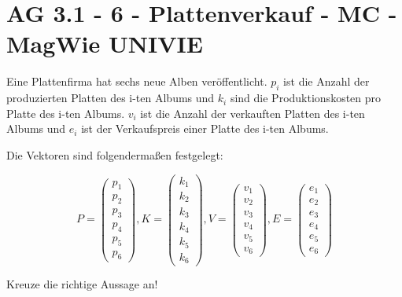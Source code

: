 \section{AG 3.1 - 6 - Plattenverkauf - MC - MagWie UNIVIE}

\begin{beispiel}[AG 3.1]{1}
Eine Plattenfirma hat sechs neue Alben veröffentlicht. $p_i$ ist die Anzahl der produzierten Platten des i-ten Albums und $k_i$ sind die Produktionskosten pro Platte des i-ten Albums. $v_i$ ist die Anzahl der verkauften Platten des i-ten Albums und $e_i$ ist der Verkaufspreis einer Platte des i-ten Albums.

Die Vektoren sind folgendermaßen festgelegt:

\[P=\left(\begin{array}{c}p_1\\p_2\\p_3\\p_4\\p_5\\p_6\end{array}\right), K=\left(\begin{array}{c}k_1\\k_2\\k_3\\k_4\\k_5\\k_6\end{array}\right), V=\left(\begin{array}{c}v_1\\v_2\\v_3\\v_4\\v_5\\v_6\end{array}\right), E=\left(\begin{array}{c}e_1\\e_2\\e_3\\e_4\\e_5\\e_6\end{array}\right)\]

Kreuze die richtige Aussage an!


\end{beispiel}
